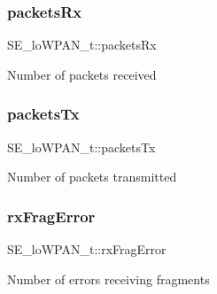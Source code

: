 \subsubsection{\texorpdfstring{packets\+Rx}{packetsRx}}
{\footnotesize\ttfamily S\+E\+\_\+lo\+W\+P\+A\+N\+\_\+t\+::packets\+Rx}

Number of packets received \mbox{\label{group__loWPAN_ga4052b1da9bfea628b6d61abc0d4c1edd}} 
\subsubsection{\texorpdfstring{packets\+Tx}{packetsTx}}
{\footnotesize\ttfamily S\+E\+\_\+lo\+W\+P\+A\+N\+\_\+t\+::packets\+Tx}

Number of packets transmitted \mbox{\label{group__loWPAN_gac2ecf874c1830af68defca2dce2d3af4}} 
\subsubsection{\texorpdfstring{rx\+Frag\+Error}{rxFragError}}
{\footnotesize\ttfamily S\+E\+\_\+lo\+W\+P\+A\+N\+\_\+t\+::rx\+Frag\+Error}

Number of errors receiving fragments 